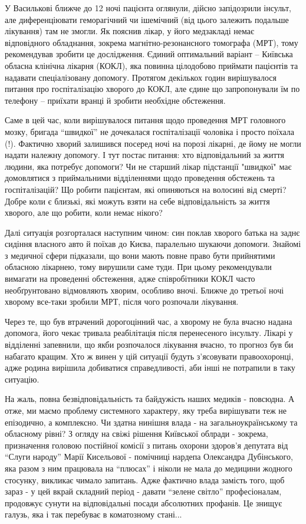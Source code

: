 У Василькові ближче до 12 ночі пацієнта оглянули, дійсно запідозрили інсульт,
але диференціювати геморагічний чи ішемічний (від цього залежить подальше
лікування) там не змогли. Як пояснив лікар, у його медзакладі немає
відповідного обладнання, зокрема магнітно-резонансного томографа (МРТ), тому
рекомендував зробити це дослідження. Єдиний оптимальний варіант – Київська
обласна клінічна лікарня (КОКЛ), яка повинна цілодобово приймати пацієнтів та
надавати спеціалізовану допомогу. Протягом декількох годин вирішувалося питання
про госпіталізацію хворого до КОКЛ, але єдине що запропонували їм по телефону –
приїхати вранці й зробити необхідне обстеження.

Саме в цей час, коли вирішувалося питання щодо проведення МРТ головного мозку,
бригада \enquote{швидкої} не дочекалася госпіталізації чоловіка і просто поїхала (!).
Фактично хворий залишився посеред ночі на порозі лікарні, де йому не могли
надати належну допомогу. І тут постає питання: хто відповідальний за життя
людини, яка потребує допомоги? Чи не старший лікар підстанції "швидкої" має
домовлятися з приймальними відділеннями щодо проведення обстежень та
госпіталізацій? Що робити пацієнтам, які опиняються на волосині від смерті?
Добре коли є близькі, які можуть взяти на себе відповідальність за життя
хворого, але що робити, коли немає нікого?

Далі ситуація розгорталася наступним чином: син поклав хворого батька на заднє
сидіння власного авто й поїхав до Києва, паралельно шукаючи допомоги. Знайомі з
медичної сфери підказали, що вони мають повне право бути прийнятими обласною
лікарнею, тому вирушили саме туди. При цьому рекомендували вимагати на
проведенні обстеження, адже співробітники КОКЛ часто необґрунтовано відмовляють
хворим, особливо вночі. Ближче до третьої ночі хворому все-таки зробили МРТ,
після чого розпочали лікування.

Через те, що був втрачений дорогоцінний час, а хворому не була вчасно надана
допомога, його чекає тривала реабілітація після перенесеного інсульту. Лікарі у
відділенні запевнили, що якби розпочалося лікування вчасно, то прогноз був би
набагато кращим. Хто ж винен у цій ситуації будуть з’ясовувати правоохоронці,
адже родина вирішила добиватися справедливості, аби інші не потрапили в таку
ситуацію.

На жаль, повна безвідповідальність та байдужість наших медиків - повсюдна. А
отже, ми маємо проблему системного характеру, яку треба вирішувати теж не
епізодично, а комплексно. Чи здатна нинішня влада - на загальноукраїнському та
обласному рівні? З огляду на свіжі рішення Київської облради - зокрема,
призначення головою постійної комісії з питань охорони здоров'я депутата від
\enquote{Слуги народу} Марії Кисельової - помічниці нардепа Олександра Дубінського, яка
разом з ним працювала на \enquote{плюсах} і ніколи не мала до медицини жодного
стосунку, викликає чимало запитань. Адже фактично влада замість того, щоб зараз
- у цей вкрай складний період - давати \enquote{зелене світло} професіоналам, продовжує
сунути на відповідальні посади абсолютних профанів. Це знищує галузь, яка і так
перебуває в коматозному стані... 
